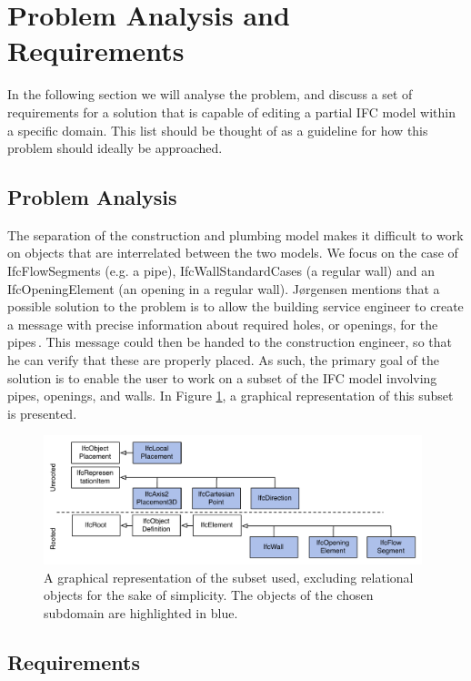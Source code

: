 \section{Problem Analysis and Requirements}
\label{sec:problem_analysis_and_requirements}
In the following section we will analyse the problem, and discuss a set of requirements for a solution that is capable of editing a partial IFC model within a specific domain. This list should be thought of as a guideline for how this problem should ideally be approached.

\subsection{Problem Analysis}
\label{subsec:problem_analysis}
The separation of the construction and plumbing model makes it difficult to work on objects that are interrelated between the two models. We focus on the case of IfcFlowSegments (e.g. a pipe), IfcWallStandardCases (a regular wall) and an IfcOpeningElement (an opening in a regular wall). Jørgensen mentions that a possible solution to the problem is to allow the building service engineer to create a message with precise information about required holes, or openings, for the pipes\,\cite{jorgensen12}. This message could then be handed to the construction engineer, so that he can verify that these are properly placed. As such, the primary goal of the solution is to enable the user to work on a subset of the IFC model involving pipes, openings, and walls. In Figure \ref{fig:ifcheirachy}, a graphical representation of this subset is presented.

\begin{figure}[t]
    \centering
        \includegraphics[width=110mm]{images/IfcHeirachy.pdf}
    \caption{A graphical representation of the subset used, excluding relational objects for the sake of simplicity. The objects of the chosen subdomain are highlighted in blue.}
    \label{fig:ifcheirachy}
\end{figure}

\subsection{Requirements}
\label{subsec:requirements}
